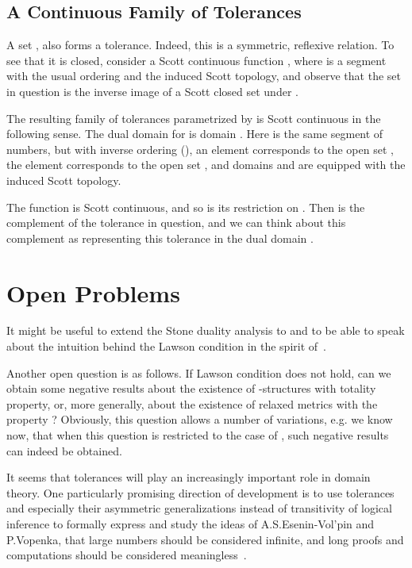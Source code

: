 \subsection{A Continuous Family of Tolerances}

A set ,
also forms a tolerance. Indeed, this is a symmetric, reflexive
relation. To see that it is closed, consider a Scott continuous
function , where  is
a segment  with the usual ordering and the induced
Scott topology, and observe that the set in question is
the inverse image of a Scott closed set 
under .

The resulting family of tolerances parametrized by  is
Scott continuous in the following sense. The dual domain for
 is domain . Here  is the same segment of numbers,
but with inverse ordering (),
an element  corresponds to the open set ,
the element  corresponds to the open set ,
and domains  and  are equipped with
the induced Scott topology.

The function 
is Scott continuous, and so is its restriction on .
Then  is the complement of the tolerance in
question, and we can think about this complement as representing
this tolerance in the dual domain .
 
\section{Open Problems}

It might be useful to extend the Stone duality analysis to
 and to be able to speak about the intuition behind
the Lawson condition in the spirit of~\cite{Smyth}.

Another open question is as follows.
If Lawson condition does not hold, can we obtain some negative
results about the existence of -structures
with totality property, or, more generally,
about the existence of relaxed metrics
with the property ?
Obviously, this question allows a number of variations,
e.g. we know now, that when this
 question is restricted to the case of ,
such negative results can indeed be obtained.

It seems that tolerances will play an increasingly important role
in domain theory. One particularly promising direction of development
is to use tolerances and especially their asymmetric generalizations
instead of transitivity of logical inference to formally
express and study the ideas of A.S.Esenin-Vol'pin and P.Vopenka,
that large numbers should be considered infinite,
and long proofs and computations should be considered 
meaningless~\cite{Vopenka}.


